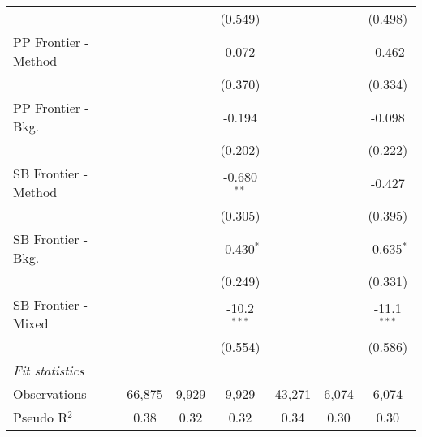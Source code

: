 \begin{tabular}{lcccccc}
                        &         &         & (0.549)       &         &         & (0.498)\\   
   PP Frontier - Method &         &         & 0.072         &         &         & -0.462\\   
                        &         &         & (0.370)       &         &         & (0.334)\\   
   PP Frontier - Bkg.   &         &         & -0.194        &         &         & -0.098\\   
                        &         &         & (0.202)       &         &         & (0.222)\\   
   SB Frontier - Method &         &         & -0.680$^{**}$ &         &         & -0.427\\   
                        &         &         & (0.305)       &         &         & (0.395)\\   
   SB Frontier - Bkg.   &         &         & -0.430$^{*}$  &         &         & -0.635$^{*}$\\   
                        &         &         & (0.249)       &         &         & (0.331)\\   
   SB Frontier - Mixed  &         &         & -10.2$^{***}$ &         &         & -11.1$^{***}$\\   
                        &         &         & (0.554)       &         &         & (0.586)\\   
   \midrule
   \emph{Fit statistics}\\
   Observations         & 66,875  & 9,929   & 9,929         & 43,271  & 6,074   & 6,074\\  
   Pseudo R$^2$         & 0.38    & 0.32    & 0.32          & 0.34    & 0.30    & 0.30\\  
   

\end{tabular}
